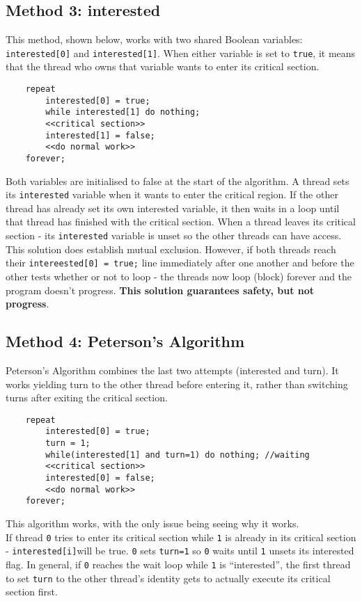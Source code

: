 \subsection{Method 3: interested}
This method, shown below, works with two shared Boolean variables: \verb|interested[0]| and \verb|interested[1]|. When either variable is set to \verb|true|, it means that the thread who owns that variable wants to enter its critical section.
\begin{verbatim}
    repeat
        interested[0] = true;
        while interested[1] do nothing;
        <<critical section>>
        interested[1] = false;
        <<do normal work>>
    forever;
\end{verbatim}
Both variables are initialised to false at the start of the algorithm. A thread sets its \verb|interested| variable when it wants to enter the critical region. If the other thread has already set its own interested variable, it then waits in a loop until that thread has finished with the critical section. When a thread leaves its critical section - its \verb|interested| variable is unset so the other threads can have access.\\

This solution does establish mutual exclusion. However, if both threads reach their \verb|intereested[0] = true;| line immediately after one another and before the other tests whether or not to loop - the threads now loop (block) forever and the program doesn't progress. \textbf{This solution guarantees safety, but not progress}. 

\subsection{Method 4: Peterson's Algorithm}
Peterson's Algorithm combines the last two attempts (interested and turn). It works yielding turn to the other thread before entering it, rather than switching turns after exiting the critical section. 
\begin{verbatim}
    repeat
        interested[0] = true;
        turn = 1;
        while(interested[1] and turn=1) do nothing; //waiting
        <<critical section>>
        interested[0] = false;
        <<do normal work>>
    forever;
\end{verbatim}
This algorithm works, with the only issue being seeing why it works.\\

If thread \verb|0| tries to enter its critical section while \verb|1| is already in its critical section - \verb|interested[i]|will be true. \verb|0| sets \verb|turn=1| so \verb|0| waits until \verb|1| unsets its interested flag. In general, if \verb|0| reaches the wait loop while \verb|1| is ``interested'', the first thread to set \verb|turn| to the other thread's identity gets to actually execute its critical section first.


